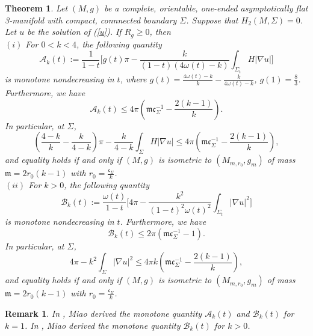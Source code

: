 \documentclass[12pt]{article}
\theoremstyle{definition}
\theoremstyle{plain}
\newtheorem{theorem}{Theorem}[section]
\newtheorem{remark}{Remark}[section]
\numberwithin{equation}{section}
\begin{document}
\begin{theorem}\label{th 1.1}
	Let $ (M,g) $ be a complete, orientable, one-ended asymptotically flat 3-manifold with compact, connnected boundary $ \Sigma $. Suppose that $ H_{2}(M,\Sigma)=0 $. Let $ u $ be the solution of (\ref{u}). If $ R_{g}\geq 0 $, then
	\\
	$ (i) $ For $ 0<k<4 $, the following quantity 
	\begin{equation}\label{P}
	 \mathcal{A}_{k}(t):=\frac{1}{1-t}\Big[g(t)\pi-\frac{k}{(1-t)(4\omega(t)-k)}\int_{\Sigma_{t}}H|\nabla u|\Big] 
    \end{equation}
	is monotone nondecreasing in $ t $, where $ g(t)=\frac{4\omega(t)-k}{k}-\frac{k}{4\omega(t)-k} $, $ g(1)=\frac{8}{3} $. Furthermore, we have
	\begin{equation}\label{lim A}
	\mathcal{A}_{k}(t)\leq 4\pi (\mathfrak{m}\mathfrak{c}_{\Sigma}^{-1}-\frac{2(k-1)}{k}).
	\end{equation}
	In particular, at $ \Sigma $,
	\begin{equation}\label{lim A0}
	(\frac{4-k}{k}-\frac{k}{4-k})\pi-\frac{k}{4-k}\int_{\Sigma}H|\nabla u|\leq 4\pi (\mathfrak{m}\mathfrak{c}_{\Sigma}^{-1}-\frac{2(k-1)}{k}),
	\end{equation}
	and equality holds if and only if  $ (M,g) $ is isometric to $ (M_{m,r_{0}},g_{m}) $ of mass $ \mathfrak{m}=2r_{0}(k-1) $ with $ r_{0}=\frac{\mathfrak{c}_{\Sigma}}{k} $.
	\\
	$ (ii) $ For $ k>0 $, the following quantity
	\begin{equation}\label{Q}
	\mathcal{B}_{k}(t):=\frac{\omega(t)}{1-t}\Big[4\pi-\frac{k^{2}}{(1-t)^{2}\omega(t)^{2}}\int_{\Sigma_{t}}|\nabla u|^{2} \Big]
	\end{equation}
	is monotone nondecreasing in $ t $. Furthermore, we have
	\begin{equation}\label{lim B}
	\mathcal{B}_{k}(t)\leq 2\pi (\mathfrak{m}\mathfrak{c}_{\Sigma}^{-1}-1).
	\end{equation}
	In particular, at $ \Sigma $,
	\begin{equation}\label{lim B0}
	4\pi-k^{2}\int_{\Sigma}|\nabla u|^{2}\leq 4\pi k (\mathfrak{m}\mathfrak{c}_{\Sigma}^{-1}-\frac{2(k-1)}{k}),
	\end{equation}
	and equality holds if and only if  $ (M,g) $ is isometric to $ (M_{m,r_{0}},g_{m}) $ of mass $ \mathfrak{m}=2r_{0}(k-1) $ with $ r_{0}=\frac{\mathfrak{c}_{\Sigma}}{k} $.
\end{theorem}
\begin{remark}
In \cite{Miao}, Miao derived the monotone quantity $ \mathcal{A}_{k}(t) $ and $ \mathcal{B}_{k}(t) $ for $ k=1 $. In \cite{Miao 0}, Miao derived the monotone quantity $ \mathcal{B}_{k}(t) $ for $ k>0 $.
\end{remark}
\end{document}
